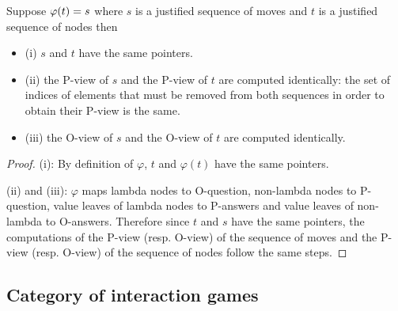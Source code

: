 \begin{property}
\label{proper:phi_pview} Suppose $\varphi(t) = s$ where $s$ is a
justified sequence of moves and $t$ is a justified sequence of nodes
then
\begin{itemize}
\item (i) $s$ and $t$ have the same pointers.
\item (ii) the P-view of $s$ and the P-view of $t$ are computed
identically: the set of indices of elements that must be removed
from both sequences in order to obtain their P-view is the same.
\item (iii) the O-view of $s$ and the O-view of $t$ are computed identically.
\end{itemize}
\end{property}
\begin{proof}
(i): By definition of $\varphi$, $t$ and $\varphi(t)$ have the same
pointers.

(ii) and (iii): $\varphi$ maps lambda nodes to O-question,
non-lambda nodes to P-question, value leaves of lambda nodes to P-answers and
value leaves of non-lambda to O-answers. Therefore since $t$ and $s$ have the
same pointers, the computations of the P-view (resp. O-view) of the
sequence of moves and the P-view (resp. O-view) of the sequence of
nodes follow the same steps.
\end{proof}


%
%



\subsection{Category of interaction games}

